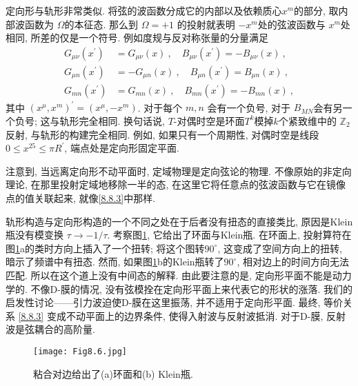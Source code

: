 定向形与轨形非常类似. 将弦的波函数分成它的内部以及依赖质心$x^{m}$的部分, 取内部波函数为 $\Omega$的本征态. 
那么到 $\Omega=+1$ 的投射就表明 $-x^{m}$处的弦波函数与 $x^{m}$处相同, 所差的仅是一个符号. 例如度规与反对称张量的分量满足
\begin{subequations} \label{8.8.3}
\begin{align}
		G_{\mu \nu}(x^{\prime}) &= G_{\mu \nu}(x) \:, \quad  B_{\mu \nu}(x^{\prime})=-B_{\mu \nu}(x) \:, \label{8.8.3a} \\ 	
		G_{\mu n}(x^{\prime}) & =-G_{\mu n}(x) \:, \quad  B_{\mu n}(x^{\prime})=B_{\mu n}(x) 	\:, \label{8.8.3b} \\
		G_{m n}(x^{\prime}) &= G_{m n}(x) \:, \quad  B_{m n}(x^{\prime})=-B_{m n}(x) \:, \label{8.8.3c}
\end{align}
\end{subequations}
其中 $(x^{\mu}, x^{m})^{\prime} = (x^{\mu},-x^{m})$.  对于每个 $m, n$ 会有一个负号, 对于 $B_{M N}$会有另一个负号; 这与轨形完全相同. 
换句话说, $T$-对偶时空是环面$T^{k}$模掉$k$个紧致维中的 $\mathds{Z}_{2}$ 反射, 与轨形的构建完全相同. 
例如, 如果只有一个周期性, 对偶时空是线段 $0 \leq x^{25} \leq \pi R^{\prime}$, 端点处是定向形固定平面.

注意到, 当远离定向形不动平面时, 定域物理是定向弦论的物理. 不像原始的非定向理论, 在那里投射定域地移除一半的态, 
在这里它将任意点的弦波函数与它在镜像点的值关联起来, 就像\eqref{8.8.3}中那样.

轨形构造与定向形构造的一个不同之处在于后者没有扭态的直接类比, 原因是Klein瓶没有模变换 $\tau \rightarrow -1/\tau$. 
考察图\ref{Fig8.6}, 它给出了环面与Klein瓶. 在环面上, 投射算符在图\ref{Fig8.6}a的类时方向上插入了一个扭转; 将这个图转$90^{\circ}$, 
这变成了空间方向上的扭转, 暗示了频谱中有扭态. 然而, 如果图\ref{Fig8.6}b的Klein瓶转了$90^{\circ}$, 相对边上的时间方向无法匹配. 
所以在这个道上没有中间态的解释. 由此要注意的是, 定向形平面不能是动力学的. 不像D-膜的情况, 没有弦模拴在定向形平面上来代表它的形状的涨落. 
我们的启发性讨论——引力波迫使D-膜在这里振荡, 并不适用于定向形平面. 最终, 等价关系 \eqref{8.8.3} 变成不动平面上的边界条件, 使得入射波与反射波抵消. 
对于D-膜, 反射波是弦耦合的高阶量.

\begin{figure}
	\begin{center}
		\texttt{[image: Fig8.6.jpg]}
		\caption{粘合对边给出了(a)环面和(b) Klein瓶.}\label{Fig8.6}
	\end{center}
\end{figure}

